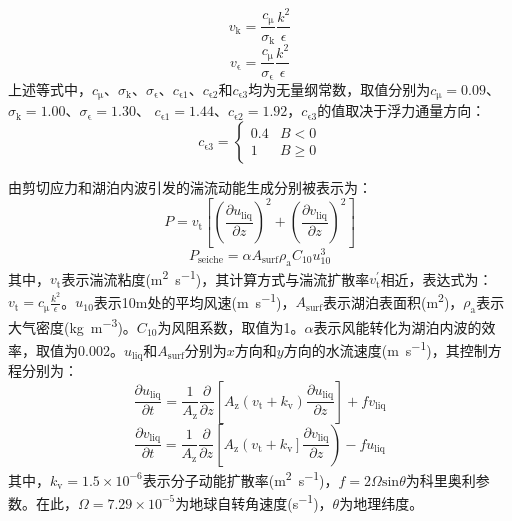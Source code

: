 \begin{equation}
    v_{\mathrm{k}} = \frac{c_{\mathrm{\mu}}}{\sigma_{\mathrm{k}}}\frac{k^2}{\epsilon}
\end{equation}
\begin{equation}
    v_{\mathrm{\epsilon}} = \frac{c_{\mathrm{\mu}}}{\sigma_{\mathrm{\epsilon}}}\frac{k^2}{\epsilon}
\end{equation}
上述等式中，$c_{\mathrm{\mu}}$、$\sigma_{\mathrm{k}}$、$\sigma_{\mathrm{\epsilon}}$、$c_{\mathrm{\epsilon 1}}$、$c_{\mathrm{\epsilon 2}}$和$c_{\mathrm{\epsilon 3}}$均为无量纲常数，取值分别为$c_{\mathrm{\mu}}=0.09$、$\sigma_{\mathrm{k}}=1.00$、$\sigma_{\mathrm{\epsilon}}=1.30$、 $c_{\mathrm{\epsilon 1}}=1.44$、$c_{\mathrm{\epsilon 2}}=1.92$，$c_{\mathrm{\epsilon 3}}$的值取决于浮力通量方向：
\begin{equation}
  c_{\mathrm{\epsilon 3}}=\left\{\begin{array}{ll}0.4 & B<0  \\ 1 & B \geqslant 0 \end{array}\right.
\end{equation}

由剪切应力和湖泊内波引发的湍流动能生成分别被表示为：
\begin{equation}
    P = v_{\mathrm{t}} \left[\left(\frac{\partial u_{\mathrm{liq}}}{\partial z}\right)^2 + \left(\frac{\partial v_{\mathrm{liq}}}{\partial z}\right)^2 \right]
\end{equation}
\begin{equation}
    P_{\mathrm{seiche}} = \alpha A_{\mathrm{surf}} \rho_{\mathrm{a}} C_{\mathrm{10}} u^{\mathrm{3}}_{\mathrm{10}}
\end{equation}
其中，$v_{\mathrm{t}}$表示湍流粘度(\unit{m^2.s^{-1}})，其计算方式与湍流扩散率$v^{\mathrm{'}}_{\mathrm{t}}$相近，表达式为：$v_{\mathrm{t}}=c_{\mathrm{\mu}} \frac{k^2}{\epsilon}$。$u_{\mathrm{10}}$表示10\unit{m}处的平均风速(\unit{m.s^{-1}})，$A_{\mathrm{surf}}$表示湖泊表面积(\unit{m^2})，$\rho_{\mathrm{a}}$表示大气密度(\unit{kg.m^{-3}})。$C_{\mathrm{10}}$为风阻系数，取值为1。$\alpha$表示风能转化为湖泊内波的效率，取值为0.002。$u_{\mathrm{liq}}$和$A_{\mathrm{surf}}$分别为$x$方向和$y$方向的水流速度(\unit{m.s^{-1}})，其控制方程分别为：
\begin{equation}
    \frac{\partial u_{\mathrm{liq}}}{\partial t} = \frac{1}{A_{\mathrm{z}}} \frac{\partial}{\partial z} \left[A_{\mathrm{z}} \left(v_{\mathrm{t}} + k_{\mathrm{v}} \right) \frac{\partial u_{\mathrm{liq}}}{\partial z}\right] + f v_{\mathrm{liq}}
\end{equation}
\begin{equation}
    \frac{\partial v_{\mathrm{liq}}}{\partial t} = \frac{1}{A_{\mathrm{z}}} \frac{\partial}{\partial z} \left[A_{\mathrm{z}} \left(v_{\mathrm{t}} + k_{\mathrm{v}} \right] \frac{\partial v_{\mathrm{liq}}}{\partial z}\right) - f u_{\mathrm{liq}}
\end{equation}
其中，$k_{\mathrm{v}}=1.5×10^{-6}$表示分子动能扩散率(\unit{m^2.s^{-1}})，$f=2 \Omega \mathrm{sin}⁡\theta$为科里奥利参数。在此，$\Omega=7.29×10^{-5}$为地球自转角速度(\unit{s^{-1}})，$\theta$为地理纬度。

